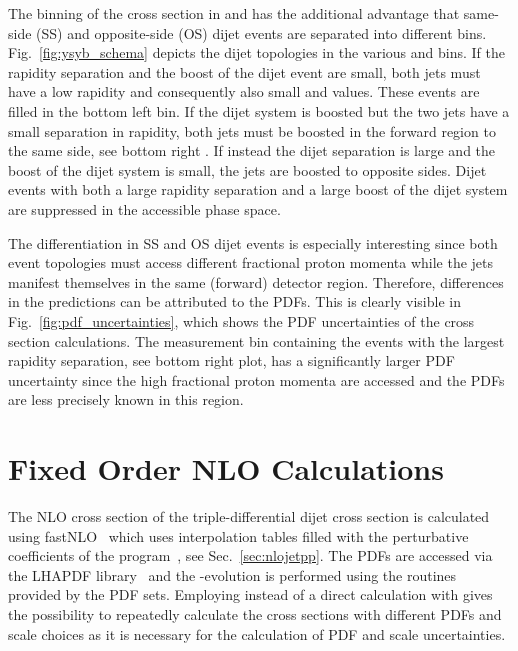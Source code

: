 The binning of the cross section in \ystar and \yboost has the additional
advantage that same-side (SS) and opposite-side (OS) dijet events are separated into
different bins. Fig.~\ref{fig:ysyb_schema} depicts the dijet topologies in the
various \ystar and \yboost bins. If the rapidity separation and the boost of the
dijet event are small, both jets must have a low rapidity and consequently also
small \ystar and \yboost values. These events are filled in the bottom left bin.
If the dijet system is boosted but the two jets have a small separation in
rapidity, both jets must be boosted in the forward region to the same side, see
bottom right . If instead the dijet separation is large and the boost of the
dijet system is small, the jets are boosted to opposite sides. Dijet events with
both a large rapidity separation and a large boost of the dijet system are
suppressed in the accessible phase space.

The differentiation in SS and OS dijet events is especially interesting since
both event topologies must access different fractional proton momenta while the
jets manifest themselves in the same (forward) detector region. Therefore,
differences in the predictions can be attributed to the PDFs. This is clearly
visible in Fig.~\ref{fig:pdf_uncertainties}, which shows the PDF uncertainties of
the cross section calculations. The measurement bin containing the events with
the largest rapidity separation, see bottom right plot, has a significantly larger
PDF uncertainty since the high fractional proton momenta are accessed and the
PDFs are less precisely known in this region.

\section{Fixed Order NLO Calculations}

The NLO cross section of the triple-differential dijet cross section is
calculated using fastNLO~\cite{Kluge:2006xs,Britzger:2012bs} which uses
interpolation tables filled with the perturbative coefficients of the \NLOJETPP
program~\cite{Nagy:2003tz}, see Sec.~\ref{sec:nlojetpp}. The PDFs are accessed
via the LHAPDF library~\cite{Whalley:2005nh,Buckley:2014ana} and the
\as-evolution is performed using the routines provided by the PDF sets.
Employing \fastNLO instead of a direct calculation with \NLOJETPP gives the
possibility to repeatedly calculate the cross sections with  different PDFs and
scale choices as it is necessary for the calculation of PDF and scale
uncertainties.

